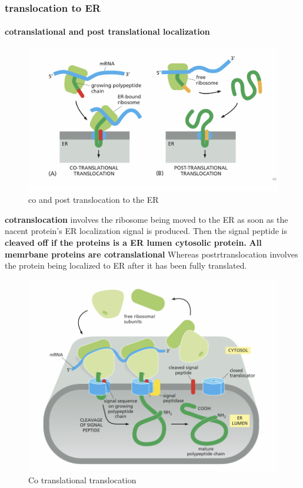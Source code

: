 \documentclass[../main.tex]{subfiles}
\begin{document}
\subsubsection{translocation to ER}

\paragraph{cotranslational and post translational localization}
\begin{figure}[H]
    \centering
    \includegraphics[width=1\linewidth]{CoTranslation.png}
    \caption{co and post translocation to the ER}
    \label{fig:enter-label}
\end{figure}

\textbf{\gls{cotranslocation}} involves the ribosome being moved to the ER as soon as the nacent protein's ER localization signal is produced. Then the signal peptide is\textbf{ cleaved off if the proteins is a ER lumen cytosolic protein.} \textbf{All memrbane proteins are cotranslational} Whereas \gls{postrtranslocation} involves the protein being localized to ER after it has been fully translated.
\begin{figure}[H]
    \centering
    \includegraphics[width=0.5\linewidth]{Sum_Cell_Bio_II//lectures//cbII4/cotranslation.png}
    \caption{Co translational translocation}
    \label{fig:enter-label}
\end{figure}
\end{document}
